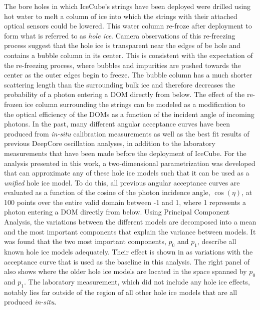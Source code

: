 The bore holes in which IceCube's strings have been deployed were drilled using hot water to melt a column of ice into which the strings with their attached optical sensors could be lowered. This water column re-froze after deployment to form what is referred to as \emph{hole ice}. Camera observations of this re-freezing process suggest that the hole ice is transparent near the edges of be hole and contains a bubble column in its center. This is consistent with the expectation of the re-freezing process, where bubbles and impurities are pushed towards the center as the outer edges begin to freeze. The bubble column has a much shorter scattering length than the surrounding bulk ice and therefore decreases the probability of a photon entering a DOM directly from below.
The effect of the re-frozen ice column surrounding the strings can be modeled as a modification to the optical efficiency of the DOMs as a function of the incident angle of incoming photons. In the past, many different angular acceptance curves have been produced from \emph{in-situ} calibration measurements as well as the best fit results of previous DeepCore oscillation analyses, in addition to the laboratory measurements that have been made before the deployment of IceCube. For the analysis presented in this work, a two-dimensional parametrization was developed that can approximate any of these hole ice models such that it can be used as a \emph{unified} hole ice model. To do this, all previous angular acceptance curves are evaluated as a function of the cosine of the photon incidence angle, $\cos(\eta)$, at 100 points over the entire valid domain between -1 and 1, where 1 represents a photon entering a DOM directly from below. Using Principal Component Analysis, the variations between the different models are decomposed into a mean and the most important components that explain the variance between models. It was found that the two most important components, $p_0$ and $p_1$, describe all known hole ice models adequately. Their effect is shown in  as variations with the acceptance curve that is used as the baseline in this analysis. The right panel of  also shows where the older hole ice models are located in the space spanned by $p_0$ and $p_1$. The laboratory measurement, which did not include any hole ice effects, notably lies far outside of the region of all other hole ice models that are all produced \emph{in-situ}.

